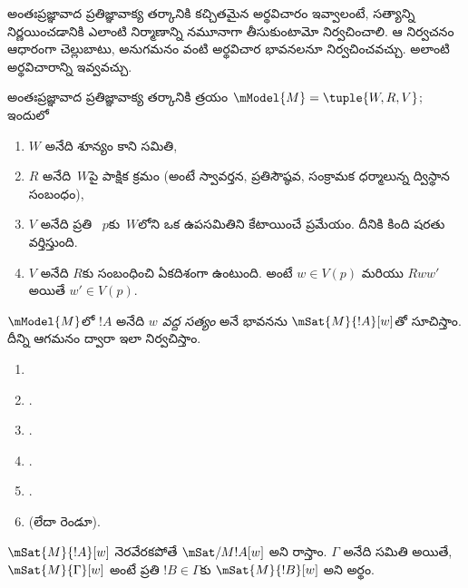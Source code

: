 \documentclass[../../../include/open-logic-section]{subfiles}
\begin{document}


అంతఃప్రజ్ఞావాద ప్రతిజ్ఞావాక్య తర్కానికి కచ్చితమైన
అర్థవిచారం ఇవ్వాలంటే,  సత్యాన్ని నిర్ణయించడానికి
ఎలాంటి నిర్మాణాన్ని నమూనాగా తీసుకుంటామో నిర్వచించాలి.
ఆ నిర్వచనం ఆధారంగా చెల్లుబాటు, అనుగమనం వంటి అర్థవిచార
భావనలనూ నిర్వచించవచ్చు. 
అలాంటి అర్థవిచారాన్ని ఇవ్వవచ్చు.

\begin{defn}
  అంతఃప్రజ్ఞావాద ప్రతిజ్ఞావాక్య తర్కానికి
  త్రయం $\mModel{M} = \tuple{W, R, V}$; ఇందులో
  \begin{enumerate}
  \item $W$ అనేది శూన్యం కాని సమితి,
  \item $R$ అనేది~$W$పై పాక్షిక క్రమం
    (అంటే స్వావర్తన, ప్రతిసౌష్ఠవ, సంక్రామక ధర్మాలున్న
    ద్విస్థాన సంబంధం),
  \item $V$ అనేది ప్రతి ~$p$కు~$W$లోని ఒక ఉపసమితిని కేటాయించే
    ప్రమేయం. దీనికి కింది షరతు వర్తిస్తుంది.
  \item $V$ అనేది $R$కు సంబంధించి ఏకదిశంగా ఉంటుంది.
    అంటే $w
    \in V(p)$ మరియు $Rww'$ అయితే $w' \in V(p)$.
  \end{enumerate}
\end{defn}

\begin{defn}
  $\mModel{M}$లో $!A$ అనేది \emph{$w$ వద్ద సత్యం}
  అనే భావనను $\mSat{M}{!A}[w]$తో సూచిస్తాం.
  దీన్ని ఆగమనం ద్వారా ఇలా నిర్వచిస్తాం.
  \begin{enumerate}
  \item {}
  \item {}.
  \item {}.
  \item {}.
  \item {}.
  \item {} (లేదా రెండూ).
  \end{enumerate}
  $\mSat{M}{!A}[w]$ నెరవేరకపోతే $\mSat/{M}{!A}[w]$
  అని రాస్తాం. $\Gamma$ అనేది
 సమితి అయితే,
$\mSat{M}{\Gamma}[w]$ అంటే ప్రతి $!B \in \Gamma$కు
$\mSat{M}{!B}[w]$ అని అర్థం.
\end{defn}
\end{document}
